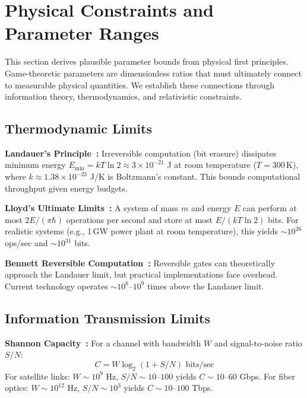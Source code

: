 \documentclass[11pt]{article}
\begin{document}

\section{Physical Constraints and Parameter Ranges}
\label{sec:S2}

This section derives plausible parameter bounds from physical first principles. Game-theoretic parameters are dimensionless ratios that must ultimately connect to measurable physical quantities. We establish these connections through information theory, thermodynamics, and relativistic constraints.

\subsection{Thermodynamic Limits}
\label{sec:S2.1}

\textbf{Landauer's Principle~\cite{landauer.1961}:} Irreversible computation (bit erasure) dissipates minimum energy $E_{\text{min}} = kT \ln 2 \approx 3 \times 10^{-21}$ J at room temperature ($T=300$\,K), where $k \approx 1.38 \times 10^{-23}$ J/K is Boltzmann's constant. This bounds computational throughput given energy budgets.

\noindent\textbf{Lloyd's Ultimate Limits~\cite{lloyd.2000}:} A system of mass $m$ and energy $E$ can perform at most $2E/(\pi\hbar)$ operations per second and store at most $E/(kT \ln 2)$ bits. For realistic systems (e.g., 1\,GW power plant at room temperature), this yields ${\sim}10^{26}$ ops/sec and ${\sim}10^{31}$ bits.

\noindent\textbf{Bennett Reversible Computation~\cite{bennett.1982}:} Reversible gates can theoretically approach the Landauer limit, but practical implementations face overhead. Current technology operates ${\sim}10^6$--$10^{9}$ times above the Landauer limit.

\subsection{Information Transmission Limits}
\label{sec:S2.2}

\textbf{Shannon Capacity~\cite{shannon.1948}:} For a channel with bandwidth $W$ and signal-to-noise ratio $S/N$:
\begin{equation}
C = W \log_2(1 + S/N) \text{ bits/sec}
\label{eq:shannon}
\end{equation}
For satellite links: $W \sim 10^9$ Hz, $S/N \sim 10$--$100$ yields $C \sim 10$--$60$ Gbps. For fiber optics: $W \sim 10^{12}$ Hz, $S/N \sim 10^3$ yields $C \sim 10$--$100$ Tbps.
\end{document}
